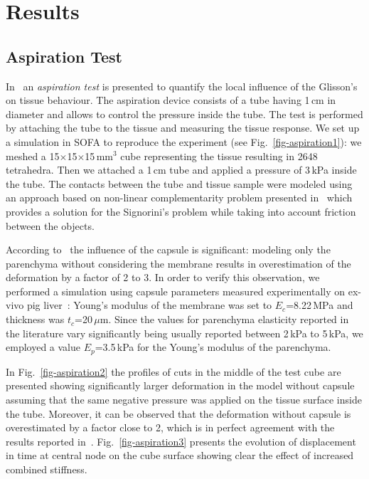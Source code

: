 \section{Results} %
\subsection{Aspiration Test}
In~\cite{Hollenstein2006} an \emph{aspiration test} is presented to quantify the local influence of the Glisson's on tissue behaviour.
The aspiration device consists of a tube having 1\,cm in diameter and allows to
control the pressure inside the tube. The test is performed by
attaching the tube to the tissue and measuring the tissue response. We
set up a simulation in SOFA to reproduce the experiment (see
Fig.~\ref{fig-aspiration1}): we meshed a 15$\times$15$\times$15\,mm$^3$ 
cube representing the tissue resulting in 2648 tetrahedra. Then we attached a 1\,cm tube 
and applied a pressure of 3\,kPa inside the tube. The contacts between the tube and tissue sample were modeled using 
an approach based on non-linear complementarity problem presented in~\cite{Duriez2006b} which provides a solution for 
the Signorini's problem while taking into account friction between the objects.

According to~\cite{Hollenstein2006} the influence of the capsule is significant: modeling 
only the parenchyma without considering the membrane results in overestimation of the deformation by a factor of 2 to 3. 
In order to verify this observation, we performed a simulation using capsule parameters measured experimentally on 
ex-vivo pig liver~\cite{Umale2011}: Young's modulus of the membrane was set to $E_c$=8.22\,MPa and thickness was
$t_c$=20\,$\mu$m. 
Since the values for parenchyma elasticity reported in the literature vary significantly being usually reported between 2\,kPa to 5\,kPa, 
we employed a value $E_p$=3.5\,kPa for the Young's modulus of the parenchyma. 

In Fig.~\ref{fig-aspiration2} the profiles of cuts in the middle of the
test cube are presented showing significantly larger deformation in the model without capsule assuming that the same negative pressure was applied 
on the tissue surface inside the tube. Moreover, it can be observed that the deformation without capsule is overestimated by a factor 
close to 2, which is in perfect agreement with the results reported in~\cite{Hollenstein2006}.
Fig.~\ref{fig-aspiration3} presents the evolution of displacement in time at central node on the cube surface showing clear the effect of increased combined stiffness.

